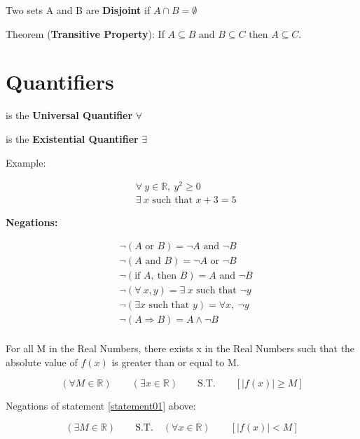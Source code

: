 Two sets A and B are \textbf{Disjoint} if $A \cap B = \emptyset$

Theorem (\textbf{Transitive Property}): If $A \subseteq B \text{ and } B \subseteq C \text{ then } A \subseteq C$.

\section{Quantifiers}

 is the \textbf{Universal Quantifier} $\forall$

 is the \textbf{Existential Quantifier} $\exists$

Example:

\[
  \begin{aligned}
    &\forall\ y \in \mathbb{R},\ y^{2} \geq 0\\
    &\exists\ x \text{ such that } x+3=5
  \end{aligned}
\]

\textbf{Negations:}

\[
\begin{aligned}
  &\neg(A \text{ or } B) = \neg A \text{ and } \neg B\\
  &\neg(A \text{ and } B)= \neg A \text{ or } \neg B\\
  &\neg(\text{if } A,\ \text{then } B) = A \text{ and } \neg B\\
  &\neg (\forall\ x,y)= \exists\ x \text{ such that } \neg y\\
  &\neg (\exists x \text{ such that } y)= \forall x,\ \neg y\\
  &\neg (A \Longrightarrow B) = A \wedge \neg B\\
\end{aligned}
\]

For all M in the Real Numbers, there exists x in the Real Numbers such that the absolute value of $f(x)$ is greater than or equal to M.

\begin{equation}
  (\forall M \in \mathbb{R})\qquad (\exists x \in \mathbb{R})\qquad  \text{S.T.}\qquad  [|f(x)| \geq M]
  \label{statement01}
\end{equation}

Negations of statement \ref{statement01} above:

\begin{equation*}
  (\exists M \in \mathbb{R})\qquad \text{S.T.}\quad (\forall x \in \mathbb{R})\qquad  [|f(x)| < M]
\end{equation*}


